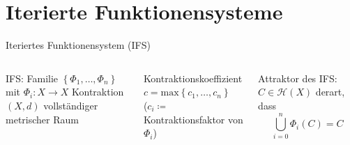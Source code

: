\documentclass[10pt]{beamer}
\renewcommand{\max}{\text{max}}
\begin{document}
\section{Iterierte Funktionensysteme}

\begin{frame}{Iteriertes Funktionensystem (IFS)}
  \begin{columns}[T,onlytextwidth]
      \alert{IFS}: Familie \( \left \{ \Phi_1, \dots, \Phi_n \right \} \) mit \( \Phi_i : X \to X \) Kontraktion \\
      \scriptsize{\( (X,d) \) vollständiger metrischer Raum}
    
      \normalsize{}
      \alert{Kontraktionskoeffizient} \( c = \max\left \{ c_1, \dots, c_n \right \} \) \\
      \scriptsize{(\( c_i \coloneqq \) Kontraktionsfaktor von \( \Phi_i \))}
    
      \normalsize{}
      \alert{Attraktor} des IFS:\@ \( C \in \mathcal{H}(X) \) derart, dass
      \begin{equation*}
        \bigcup_{i=0}^n \Phi_i(C) = C
      \end{equation*}


\end{columns}
\end{frame}
\end{document}
